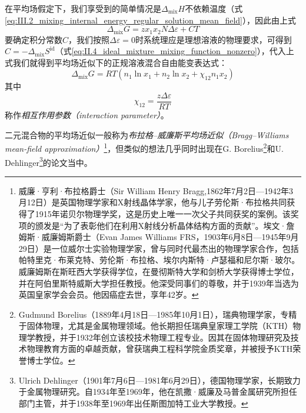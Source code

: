 \documentclass[main.tex]{subfiles}
\begin{document}
在平均场假定下，我们享受到的简单情况是$\Delta_\text{mix}H$不依赖温度（式\eqref{eq:III.2_mixing_internal_energy_regular_solution_mean_field}），因此由上式
\[\Delta_\text{mix}G=zx_1x_2N\Delta\varepsilon+CT\]
要确定积分常数$C$，我们按照$\Delta\varepsilon=0$时系统理应是理想溶液的物理要求，可得到$C=-\Delta_\text{mix}S^\text{id}$（式\eqref{eq:II.4_ideal_mixture_mixing_function_nonzero}），代入上式我们就得到平均场近似下的正规溶液混合自由能变表达式：
\begin{equation}
  \Delta_\text{mix}G=RT\left(n_1\ln x_1+n_2\ln x_2+\chi_{12}n_1x_2\right)
\end{equation}
其中
\[\chi_{12}=\frac{z\Delta\varepsilon}{RT}\]
称作\emph{相互作用参数（interaction parameter）}。

二元混合物的平均场近似一般称为\emph{布拉格--威廉斯平均场近似（Bragg--Williams mean-field approximation）}\cite{Bragg1934,Bragg1935}\footnote{威廉·亨利·布拉格爵士（Sir William Henry Bragg,1862年7月2日—1942年3月12日）是英国物理学家和X射线晶体学家，他与儿子劳伦斯·布拉格共同获得了1915年诺贝尔物理学奖，这是历史上唯一一次父子共同获奖的案例。该奖项的颁发是“为了表彰他们在利用X射线分析晶体结构方面的贡献”。埃文·詹姆斯·威廉姆斯爵士（Evan James Williams FRS，1903年6月8日—1945年9月29日）是一位威尔士实验物理学家，曾与同时代最杰出的物理学家合作，包括帕特里克·布莱克特、劳伦斯·布拉格、埃尔内斯特·卢瑟福和尼尔斯·玻尔。威廉姆斯在斯旺西大学获得学位，在曼彻斯特大学和剑桥大学获得博士学位，并在阿伯里斯特威斯大学担任教授。他深受同事们的尊敬，并于1939年当选为英国皇家学会会员。他因癌症去世，享年42岁。}，但类似的想法几乎同时出现在G. Borelius\cite{Borelius1934}\footnote{Gudmund Borelius（1889年4月18日—1985年10月1日），瑞典物理学家，专精于固体物理，尤其是金属物理领域。他长期担任瑞典皇家理工学院（KTH）物理学教授，并于1932年创立该校技术物理工程专业。因其在固体物理研究及技术物理教育方面的卓越贡献，曾获瑞典工程科学院金质奖章，并被授予KTH荣誉博士学位。}和U. Dehlinger\cite{Dehlinger1934}\footnote{Ulrich Dehlinger（1901年7月6日—1981年6月29日），德国物理学家，长期致力于金属物理研究。自1934年至1969年，他在凯撒·威廉及马普金属研究所担任部门主管，并于1938年至1969年出任斯图加特工业大学教授。}的论文当中。
\end{document}
